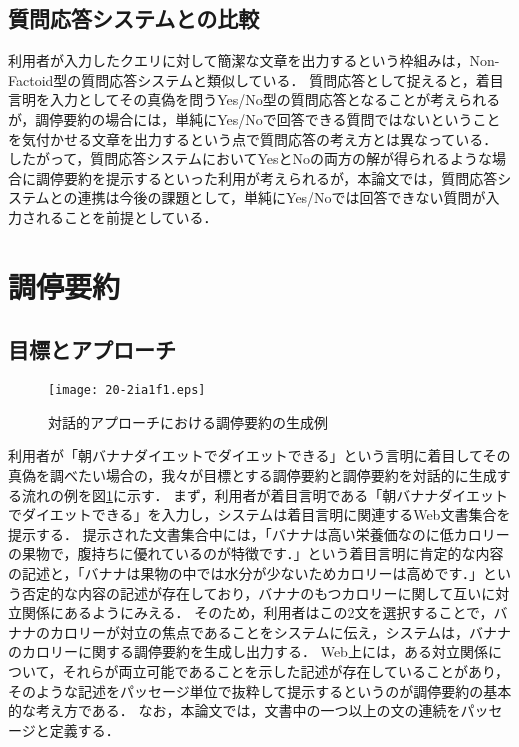 \documentclass[japanese]{jnlp_1.4}
\begin{document}
\subsection{質問応答システムとの比較}

利用者が入力したクエリに対して簡潔な文章を出力するという枠組みは，Non-Factoid型の質問応答システム\cite{Fukumoto2007}と類似している．
質問応答として捉えると，着目言明を入力としてその真偽を問うYes/No型の質問応答となることが考えられるが，調停要約の場合には，単純にYes/Noで回答できる質問ではないということを気付かせる文章を出力するという点で質問応答の考え方とは異なっている．
したがって，質問応答システムにおいてYesとNoの両方の解が得られるような場合に調停要約を提示するといった利用が考えられるが，本論文では，質問応答システムとの連携は今後の課題として，単純にYes/Noでは回答できない質問が入力されることを前提としている．


\section{調停要約}
\label{sc:concept}

\subsection{目標とアプローチ}
\label{ssc:approach}

\begin{figure}[t]
\begin{center}
\texttt{[image: 20-2ia1f1.eps]}
\end{center}
\caption{対話的アプローチにおける調停要約の生成例}
\label{fg:survey_report}
\end{figure}

利用者が「朝バナナダイエットでダイエットできる」という言明に着目してその真偽を調べたい場合の，我々が目標とする調停要約と調停要約を対話的に生成する流れの例を図\ref{fg:survey_report}に示す．
まず，利用者が着目言明である「朝バナナダイエットでダイエットできる」を入力し，システムは着目言明に関連するWeb文書集合を提示する．
提示された文書集合中には，「バナナは高い栄養価なのに低カロリーの果物で，腹持ちに優れているのが特徴です．」という着目言明に肯定的な内容の記述と，「バナナは果物の中では水分が少ないためカロリーは高めです．」という否定的な内容の記述が存在しており，バナナのもつカロリーに関して互いに対立関係にあるようにみえる．
そのため，利用者はこの2文を選択することで，バナナのカロリーが対立の焦点であることをシステムに伝え，システムは，バナナのカロリーに関する調停要約を生成し出力する．
Web上には，ある対立関係について，それらが両立可能であることを示した記述が存在していることがあり，そのような記述をパッセージ単位で抜粋して提示するというのが調停要約の基本的な考え方である．
なお，本論文では，文書中の一つ以上の文の連続をパッセージと定義する．
\end{document}
